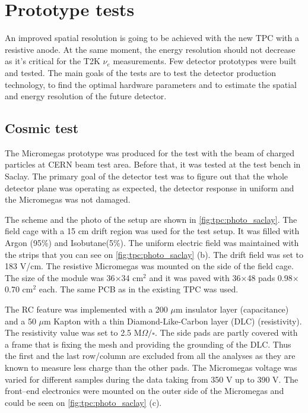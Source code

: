 \documentclass[../main.tex]{subfiles}
\begin{document}
\section{Prototype tests}
An improved spatial resolution is going to be achieved with the new TPC with a resistive anode. At the same moment, the energy resolution should not decrease as it's critical for the T2K $\nu_e$ measurements. Few detector prototypes were built and tested. The main goals of the tests are to test the detector production technology, to find the optimal hardware parameters and to estimate the spatial and energy resolution of the future detector.

\subsection{Cosmic test}
\label{sec:up:saclay}
The Micromegas prototype was produced for the test with the beam of charged particles at CERN beam test area. Before that, it was tested at the test bench in Saclay. The primary goal of the detector test was to figure out that the whole detector plane was operating as expected, the detector response in uniform and the Micromegas was not damaged.

The scheme and the photo of the setup are shown in \autoref{fig:tpc:photo_saclay}. The field cage with a 15 cm drift region was used for the test setup. It was filled with Argon (95\%) and Isobutane(5\%). The uniform electric field was maintained with the strips that you can see on \autoref{fig:tpc:photo_saclay} (b). The drift field was set to 183 V/cm. The resistive Micromegas was mounted on the side of the field cage. The size of the module was 36$\times$34 $\text{cm}^2$ and it was paved with 36$\times$48 pads 0.98$\times$0.70 $\text{cm}^2$ each. The same PCB as in the existing TPC was used.

The RC feature was implemented with a 200 $\mu\text{m}$ insulator layer (capacitance) and a 50 $\mu\text{m}$ Kapton with a thin Diamond-Like-Carbon layer (DLC) (resistivity). The resistivity value was set to 2.5 $\text{M}\Omega/\square$. The side pads are partly covered with a frame that is fixing the mesh and providing the grounding of the DLC. Thus the first and the last row/column are excluded from all the analyses as they are known to measure less charge than the other pads. The Micromegas voltage was varied for different samples during the data taking from 350 V up to 390 V. The front--end electronics were mounted on the outer side of the Micromegas and could be seen on \autoref{fig:tpc:photo_saclay} (c).
\end{document}

